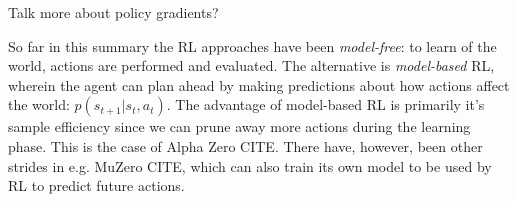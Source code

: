 \documentclass[10pt,twocolumn,letterpaper]{article}
\begin{document}
Talk more about policy gradients?

So far in this summary the \gls{RL} approaches have been \textit{model-free}: to learn of the world, actions are performed and evaluated. The alternative is \textit{model-based} \gls{RL}, wherein the agent can plan ahead by making predictions about how actions affect the world: $p(s_{t+1} \vert{} s_{t}, a_{t})$. The advantage of model-based \gls{RL} is primarily it's sample efficiency since we can prune away more actions during the learning phase. This is the case of Alpha Zero CITE. There have, however, been other strides in e.g. MuZero CITE, which can also train its own model to be used by \gls{RL} to predict future actions.






\end{document}
